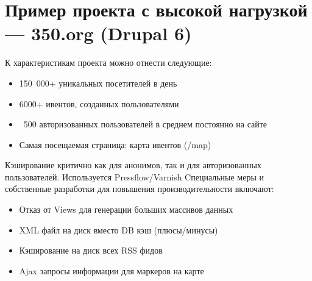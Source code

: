 \documentclass[10pt, a5paper]{article}
\begin{document}
\section*{Пример проекта с высокой нагрузкой --- 350.org (Drupal 6)}

К характеристикам проекта можно отнести следующие: 
\begin{itemize}
	\item 150 000+  уникальных посетителей в день
	\item 6000+ ивентов, созданных пользователями
	\item ~500 авторизованных пользователей в среднем постоянно на сайте
	\item Самая посещаемая страница: карта ивентов (/map)
\end{itemize}

Кэширование критично как для анонимов, так и для авторизованных пользователей. Используется Pressflow/Varnish
\longpage
Cпециальные меры и собственные разработки для повышения производительности включают:
\begin{itemize}
	\item Отказ от Views для генерации больших массивов данных
	\item  XML файл на диск вместо DB кэш (плюсы/минусы)
	\item Кэширование на диск всех RSS фидов
	\item Ajax запросы информации для маркеров на карте
\end{itemize}
\end{document}
